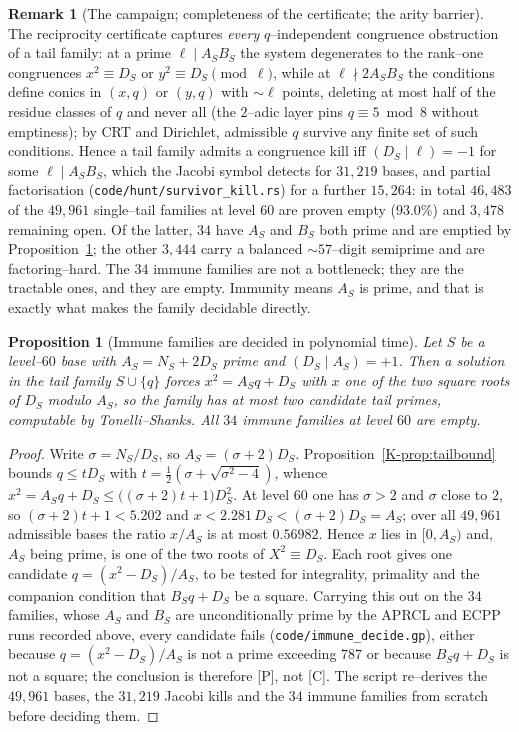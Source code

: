 \documentclass[11pt]{article}
\newtheorem{proposition}[theorem]{Proposition}
\theoremstyle{definition}
\newtheorem{remark}[theorem]{Remark}
\begin{document}
\begin{remark}[The campaign; completeness of the certificate; the arity barrier]\label{rem:campaign}
The reciprocity certificate captures \emph{every} $q$--independent congruence obstruction of a
tail family: at a prime $\ell\mid A_SB_S$ the system degenerates to the rank--one congruences
$x^2\equiv D_S$ or $y^2\equiv D_S\pmod\ell$, while at $\ell\nmid 2A_SB_S$ the conditions define
conics in $(x,q)$ or $(y,q)$ with $\sim\ell$ points, deleting at most half of the residue classes
of $q$ and never all (the $2$--adic layer pins $q\equiv5\bmod8$ without emptiness); by CRT and
Dirichlet, admissible $q$ survive any finite set of such conditions. Hence a tail family admits a
congruence kill iff $(D_S\mid\ell)=-1$ for some $\ell\mid A_SB_S$, which the Jacobi symbol
detects for $31{,}219$ bases, and partial factorisation (\texttt{code/hunt/survivor\_kill.rs}) for a
further $15{,}264$: in total $46{,}483$ of the $49{,}961$ single--tail families at level $60$ are
proven empty ($93.0\%$) and $3{,}478$ remaining open. Of the latter, $34$ have $A_S$ and $B_S$ both
prime and are emptied by Proposition~\ref{prop:immunedecide}; the other $3{,}444$ carry a balanced
${\sim}57$--digit semiprime and are factoring--hard.
The $34$ immune families are not a bottleneck; they are the tractable ones, and they are empty.
Immunity means $A_S$ is prime, and that is exactly what makes the family decidable directly.

\begin{proposition}[Immune families are decided in polynomial time]\label{prop:immunedecide}
Let $S$ be a level--$60$ base with $A_S=N_S+2D_S$ prime and $(D_S\mid A_S)=+1$. Then a solution in the
tail family $S\cup\{q\}$ forces $x^2=A_Sq+D_S$ with $x$ one of the two square roots of $D_S$ modulo
$A_S$, so the family has at most two candidate tail primes, computable by Tonelli--Shanks. All $34$
immune families at level $60$ are empty.
\end{proposition}
\begin{proof}
Write $\sigma=N_S/D_S$, so $A_S=(\sigma+2)D_S$. Proposition~\ref{K-prop:tailbound} bounds
$q\le tD_S$ with $t=\tfrac12(\sigma+\sqrt{\sigma^2-4})$, whence
$x^2=A_Sq+D_S\le\bigl((\sigma+2)t+1\bigr)D_S^2$. At level $60$ one has $\sigma>2$ and $\sigma$ close
to $2$, so $(\sigma+2)t+1<5.202$ and $x<2.281\,D_S<(\sigma+2)D_S=A_S$; over all $49{,}961$ admissible
bases the ratio $x/A_S$ is at most $0.56982$. Hence $x$ lies in $[0,A_S)$ and, $A_S$ being prime, is one
of the two roots of $X^2\equiv D_S$. Each root gives one candidate
$q=(x^2-D_S)/A_S$, to be tested for integrality, primality and the companion condition that
$B_Sq+D_S$ be a square. Carrying this out on the $34$ families, whose $A_S$ and $B_S$ are
unconditionally prime by the \textup{APRCL} and \textup{ECPP} runs recorded above, every candidate
fails \textup{(\texttt{code/immune\_decide.gp})}, either because
$q=(x^2-D_S)/A_S$ is not a prime exceeding $787$ or because $B_Sq+D_S$ is not a square; the conclusion
is therefore \textup{[P]}, not \textup{[C]}. The script re--derives the $49{,}961$ bases, the $31{,}219$
Jacobi kills and the $34$ immune families from scratch before deciding them.
\end{proof}


\end{remark}
\end{document}
